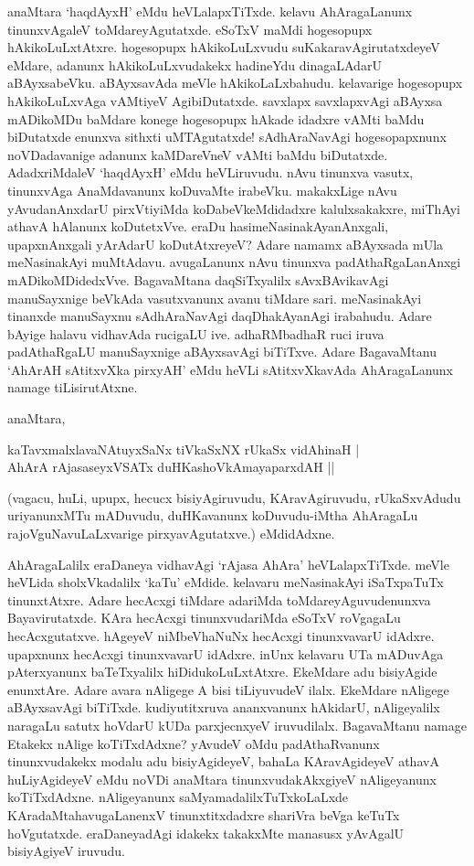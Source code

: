 anaMtara `haqdAyxH' eMdu heVLalapxTiTxde. kelavu AhAragaLanunx tinunxvAgaleV toMdareyAgutatxde. eSoTxV maMdi hogesopupx hAkikoLuLxtAtxre. hogesopupx hAkikoLuLxvudu suKakaravAgirutatxdeyeV eMdare, adanunx hAkikoLuLxvudakekx hadineYdu dinagaLAdarU aBAyxsabeVku. aBAyxsavAda meVle hAkikoLaLxbahudu. kelavarige hogesopupx hAkikoLuLxvAga vAMtiyeV AgibiDutatxde. savxlapx savxlapxvAgi aBAyxsa mADikoMDu baMdare konege hogesopupx hAkade idadxre vAMti baMdu biDutatxde enunxva sithxti uMTAgutatxde! sAdhAraNavAgi hogesopapxnunx noVDadavanige adanunx kaMDareVneV vAMti baMdu biDutatxde. AdadxriMdaleV `haqdAyxH' eMdu heVLiruvudu. nAvu tinunxva vasutx, tinunxvAga AnaMdavanunx koDuvaMte irabeVku. makakxLige nAvu yAvudanAnxdarU pirxVtiyiMda koDabeVkeMdidadxre kalulxsakakxre, miThAyi athavA hAlanunx koDutetxVve. eraDu hasimeNasinakAyanAnxgali, upapxnAnxgali yArAdarU koDutAtxreyeV? Adare namamx aBAyxsada mUla meNasinakAyi muMtAdavu. avugaLanunx nAvu tinunxva padAthaRgaLanAnxgi mADikoMDidedxVve. BagavaMtana daqSiTxyalilx sAvxBAvikavAgi manuSayxnige beVkAda vasutxvanunx avanu tiMdare sari. meNasinakAyi tinanxde manuSayxnu sAdhAraNavAgi daqDhakAyanAgi irabahudu. Adare bAyige halavu vidhavAda rucigaLU ive. adhaRMbadhaR ruci iruva padAthaRgaLU manuSayxnige aBAyxsavAgi biTiTxve. Adare BagavaMtanu `AhArAH sAtitxvXka pirxyAH' eMdu heVLi sAtitxvXkavAda AhAragaLanunx namage tiLisirutAtxne.

anaMtara,

\begin{shloka}
kaTavxmalxlavaNAtuyxSaNx tiVkaSxNX rUkaSx vidAhinaH |\\
AhArA rAjasaseyxVSATx duHKashoVkAmayaparxdAH ||
\end{shloka}

(vagacu, huLi, upupx, hecucx bisiyAgiruvudu, KAravAgiruvudu, rUkaSxvAdudu uriyanunxMTu mADuvudu, duHKavanunx koDuvudu-iMtha AhAragaLu rajoVguNavuLaLxvarige pirxyavAgutatxve.) eMdidAdxne.

AhAragaLalilx eraDaneya vidhavAgi `rAjasa AhAra' heVLalapxTiTxde. meVle heVLida sholxVkadalilx `kaTu' eMdide. kelavaru meNasinakAyi iSaTxpaTuTx tinunxtAtxre. Adare hecAcxgi tiMdare adariMda toMdareyAguvudenunxva Bayavirutatxde. KAra hecAcxgi tinunxvudariMda eSoTxV roVgagaLu hecAcxgutatxve. hAgeyeV niMbeVhaNuNx hecAcxgi tinunxvavarU idAdxre. upapxnunx hecAcxgi tinunxvavarU idAdxre. inUnx kelavaru UTa mADuvAga pAterxyanunx baTeTxyalilx hiDidukoLuLxtAtxre. EkeMdare adu bisiyAgide enunxtAre. Adare avara nAligege A bisi tiLiyuvudeV ilalx. EkeMdare nAligege aBAyxsavAgi biTiTxde. kudiyutitxruva ananxvanunx hAkidarU, nAligeyalilx naragaLu satutx hoVdarU kUDa parxjecnxyeV iruvudilalx. BagavaMtanu namage Etakekx nAlige koTiTxdAdxne? yAvudeV oMdu padAthaRvanunx tinunxvudakekx modalu adu bisiyAgideyeV, bahaLa KAravAgideyeV athavA huLiyAgideyeV eMdu noVDi anaMtara tinunxvudakAkxgiyeV nAligeyanunx koTiTxdAdxne. nAligeyanunx saMyamadalilxTuTxkoLaLxde KAradaMtahavugaLanenxV tinunxtitxdadxre shariVra beVga keTuTx hoVgutatxde. eraDaneyadAgi idakekx takakxMte manasusx yAvAgalU bisiyAgiyeV iruvudu.

